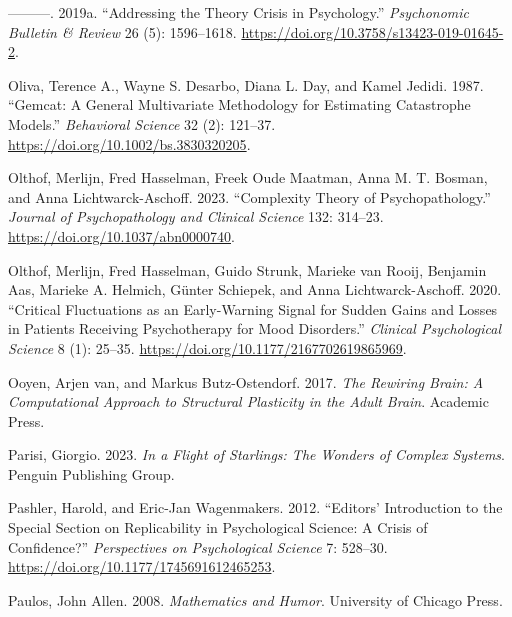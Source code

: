\documentclass[
  a4paper,
  DIV=11,
  numbers=noendperiod,
  oneside]{scrreprt}
\newlength{\cslhangindent}
\newlength{\cslentryspacingunit} %
\newenvironment{CSLReferences}[2] %
 {%
  \setlength{\parindent}{0pt}
  \ifodd #1
  \let\oldpar\par
  \def\par{\hangindent=\cslhangindent\oldpar}
  \fi
  \setlength{\parskip}{#2\cslentryspacingunit}
 }%
 {}
\begin{document}
\begin{CSLReferences}{1}{0}
\leavevmode{}%
---------. 2019a. {``Addressing the Theory Crisis in Psychology.''}
\emph{Psychonomic Bulletin \& Review} 26 (5): 1596--1618.
\url{https://doi.org/10.3758/s13423-019-01645-2}.

\leavevmode{}%
Oliva, Terence A., Wayne S. Desarbo, Diana L. Day, and Kamel Jedidi.
1987. {``Gemcat: {A} General Multivariate Methodology for Estimating
Catastrophe Models.''} \emph{Behavioral Science} 32 (2): 121--37.
\url{https://doi.org/10.1002/bs.3830320205}.

\leavevmode{}%
Olthof, Merlijn, Fred Hasselman, Freek Oude Maatman, Anna M. T. Bosman,
and Anna Lichtwarck-Aschoff. 2023. {``Complexity Theory of
Psychopathology.''} \emph{Journal of Psychopathology and Clinical
Science} 132: 314--23. \url{https://doi.org/10.1037/abn0000740}.

\leavevmode{}%
Olthof, Merlijn, Fred Hasselman, Guido Strunk, Marieke van Rooij,
Benjamin Aas, Marieke A. Helmich, Günter Schiepek, and Anna
Lichtwarck-Aschoff. 2020. {``Critical {Fluctuations} as an
{Early-Warning Signal} for {Sudden Gains} and {Losses} in {Patients
Receiving Psychotherapy} for {Mood Disorders}.''} \emph{Clinical
Psychological Science} 8 (1): 25--35.
\url{https://doi.org/10.1177/2167702619865969}.

\leavevmode{}%
Ooyen, Arjen van, and Markus Butz-Ostendorf. 2017. \emph{The {Rewiring
Brain}: {A Computational Approach} to {Structural Plasticity} in the
{Adult Brain}}. {Academic Press}.

\leavevmode{}%
Parisi, Giorgio. 2023. \emph{In a Flight of Starlings: The Wonders of
Complex Systems}. Penguin Publishing Group.

\leavevmode{}%
Pashler, Harold, and Eric-Jan Wagenmakers. 2012. {``Editors'
Introduction to the Special Section on Replicability in Psychological
Science: {A} Crisis of Confidence?''} \emph{Perspectives on
Psychological Science} 7: 528--30.
\url{https://doi.org/10.1177/1745691612465253}.

\leavevmode{}%
Paulos, John Allen. 2008. \emph{Mathematics and {Humor}}. {University of
Chicago Press}.


\end{CSLReferences}
\end{document}
